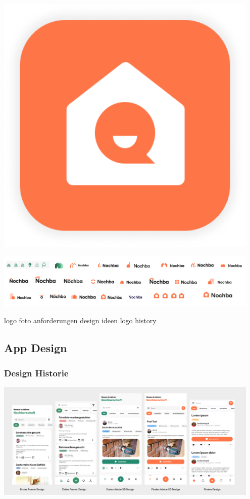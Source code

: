 \includegraphics[width=0.95\textwidth]{pics/app-logo.png}

\includegraphics[width=0.95\textwidth]{pics/logo-historie.png}

logo foto
anforderungen
design ideen
logo history
\subsection{App Design}
\subsubsection{Design Historie}

\includegraphics[width=0.95\textwidth]{pics/app-design-history.png}

